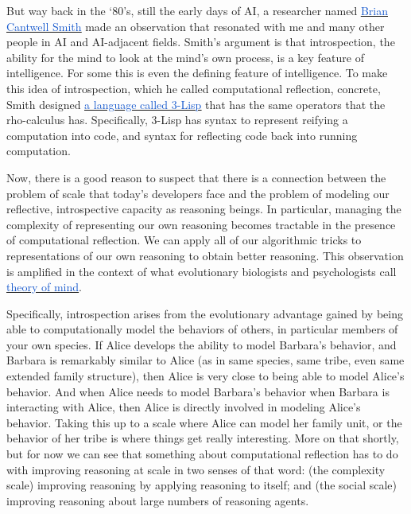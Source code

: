 \documentclass[runningheads]{llncs}
\begin{document}
\vspace{1\baselineskip}
But way back in the ‘80’s, still the early days of AI, a researcher named \href{https://en.wikipedia.org/wiki/Brian_Cantwell_Smith#:~:text=Brian\%20Cantwell\%20Smith\%20is\%20a,\%2C\%20and\%20philosophy\%2C\%20especially\%20ontology.}{\uline{\textcolor[HTML]{1155CC}{Brian Cantwell Smith}}} made an observation that resonated with me and many other people in AI and AI-adjacent fields. Smith’s argument is that introspection, the ability for the mind to look at the mind’s own process, is a key feature of intelligence. For some this is even the defining feature of intelligence. To make this idea of introspection, which he called computational reflection, concrete, Smith designed \href{https://www.ics.uci.edu/~jajones/INF102-S18/readings/17_Smith84.pdf}{\uline{\textcolor[HTML]{1155CC}{a language called 3-Lisp}}} that has the same operators that the rho-calculus has. Specifically, 3-Lisp has syntax to represent reifying a computation into code, and syntax for reflecting code back into running computation.

\vspace{1\baselineskip}
Now, there is a good reason to suspect that there is a connection between the problem of scale that today’s developers face and the problem of modeling our reflective, introspective capacity as reasoning beings. In particular, managing the complexity of representing our own reasoning becomes tractable in the presence of computational reflection. We can apply all of our algorithmic tricks to representations of our own reasoning to obtain better reasoning. This observation is amplified in the context of what evolutionary biologists and psychologists call \href{https://en.wikipedia.org/wiki/Theory_of_mind}{\uline{\textcolor[HTML]{1155CC}{theory of mind}}}. 

\vspace{1\baselineskip}
Specifically, introspection arises from the evolutionary advantage gained by being able to computationally model the behaviors of others, in particular members of your own species. If Alice develops the ability to model Barbara’s behavior, and Barbara is remarkably similar to Alice (as in same species, same tribe, even same extended family structure), then Alice is very close to being able to model Alice’s behavior. And when Alice needs to model Barbara’s behavior when Barbara is interacting with Alice, then Alice is directly involved in modeling Alice’s behavior. Taking this up to a scale where Alice can model her family unit, or the behavior of her tribe is where things get really interesting. More on that shortly, but for now we can see that something about computational reflection has to do with improving reasoning at scale in two senses of that word: (the complexity scale) improving reasoning by applying reasoning to itself; and (the social scale) improving reasoning about large numbers of reasoning agents.
\end{document}
